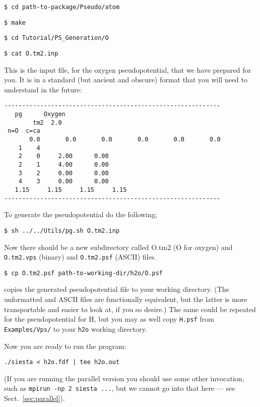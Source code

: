 \documentclass[11pt]{article}
\begin{document}
{\tt \$ cd path-to-package/Pseudo/atom}

{\tt \$ make}

{\tt \$ cd Tutorial/PS\_Generation/O}

{\tt \$ cat O.tm2.inp}

\noindent
This is the input file, for the oxygen pseudopotential,
that we have prepared for you.
It is in a standard (but ancient and obscure) format that
you will need to understand in the future:
\begin{verbatim}
------------------------------------------------------------
   pg      Oxygen
        tm2  2.0
 n=O  c=ca
       0.0       0.0       0.0       0.0       0.0       0.0
    1    4
    2    0     2.00      0.00
    2    1     4.00      0.00
    3    2     0.00      0.00
    4    3     0.00      0.00
   1.15     1.15     1.15     1.15
------------------------------------------------------------
\end{verbatim}

To generate the pseudopotential do the following;

{\tt \$ sh ../../Utils/pg.sh O.tm2.inp}

\noindent
Now there should be a new subdirectory called O.tm2 (O for oxygen)
and {\tt O.tm2.vps} (binary) and {\tt O.tm2.psf} (ASCII) files.

{\tt \$ cp O.tm2.psf path-to-working-dir/h2o/O.psf}

\noindent
copies the generated pseudopotential file to your working directory.
(The unformatted and ASCII files are functionally equivalent, but
the latter is more transportable and easier to look at, if you so
desire.) The same could be repeated for the pseudopotential for H,
but you may as well copy {\tt H.psf} from {\tt Examples/Vps/}
to your {\tt h2o} working directory.

\noindent
Now you are ready to run the program:

{\tt ./siesta < h2o.fdf | tee h2o.out}

\noindent
(If you are running the parallel version you should use some other
invocation, such as {\tt mpirun -np 2 siesta ...}, but we cannot
go into that here --- see Sect.~\ref{sec:parallel}).
\end{document}

